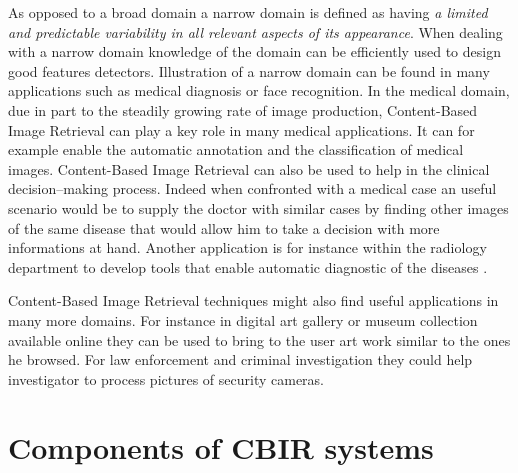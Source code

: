   As opposed to a broad domain a narrow domain is defined as having \textit{a limited and predictable variability in all relevant aspects of its appearance}. When dealing with a narrow domain knowledge of the domain can be efficiently used to design good features detectors. Illustration of a narrow domain can be found in many applications such as medical diagnosis or face recognition. In the medical domain, due in part to the steadily growing rate of image production, Content-Based Image Retrieval can play a key role in many medical applications\cite{muller2004review}. It can for example enable the automatic annotation and the classification of medical images. Content-Based Image Retrieval can also be used to help in the clinical decision–making process. Indeed when confronted with a medical case an useful scenario would be to supply the doctor with similar cases by finding other images of the same disease that would allow him to take a decision with more informations at hand. Another application is for instance within the radiology department to develop tools that enable automatic diagnostic of the diseases \cite{kahn1994artificial}.



  Content-Based Image Retrieval techniques might also find useful applications in many more domains. For instance in digital art gallery or museum collection available online they can be used to bring to the user art work similar to the ones he browsed. For law enforcement and criminal investigation they could help investigator to process pictures of security cameras.


  \section{Components of CBIR systems}

